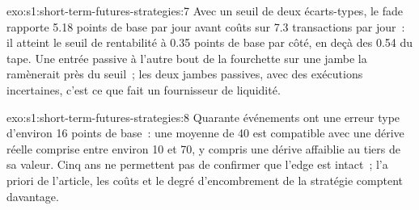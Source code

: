 \begin{solution}{exo:s1:short-term-futures-strategies:7}
Avec un seuil de deux écarts-types, le fade rapporte 5.18 points de base par jour avant coûts sur 7.3 transactions par jour~: il atteint le seuil de rentabilité à 0.35 points de base
par côté, en deçà des 0.54 du tape. Une entrée passive à l'autre bout de la fourchette sur une jambe la ramènerait près du seuil~; les deux jambes passives, avec des exécutions
incertaines, c'est ce que fait un fournisseur de liquidité.
\end{solution}

\begin{solution}{exo:s1:short-term-futures-strategies:8}
Quarante événements ont une erreur type d'environ 16 points de base~: une moyenne de 40 est compatible avec une dérive réelle comprise entre environ 10 et 70, y compris une
dérive affaiblie au tiers de sa valeur. Cinq ans ne permettent pas de confirmer que l'edge est intact~; l'a priori de l'article, les coûts et le degré d'encombrement de la stratégie comptent davantage.
\end{solution}

